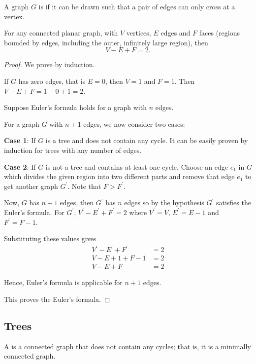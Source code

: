 \begin{definition}
A graph $G$ is  if it can be drawn such that a pair of edges can only cross at a vertex.
\end{definition}

\begin{theorem}
For any connected planar graph, with $V$ vertices, $E$ edges and $F$ faces (regions bounded by edges, including the outer, infinitely large region), then
\begin{equation}
V-E+F=2.
\end{equation}
\end{theorem}

\begin{proof}
We prove by induction.

If $G$ has zero edges, that is $E=0$, then $V=1$ and $F=1$. Then $V-E+F=1-0+1=2$.

Suppose Euler's formula holds for a graph with $n$ edges.

For a graph $G$ with $n+1$ edges, we now consider two cases:

\textbf{Case 1}: If $G$ is a tree and does not contain any cycle. It can be easily proven by induction for trees with any number of edges.

\textbf{Case 2}: If $G$ is not a tree and contains at least one cycle. Choose an edge $e_1$ in $G$ which divides the given region into two different parts and remove that edge $e_1$ to get another graph $G^\prime$. Note that $F>F^\prime$.

Now, $G$ has $n+1$ edges, then $G^\prime$ has $n$ edges so by the hypothesis $G^\prime$ satisfies the Euler's formula. For $G^\prime$, $V^\prime-E^\prime+F^\prime=2$ where $V^\prime=V$, $E^\prime=E-1$ and $F^\prime=F-1$.

Substituting these values gives
\begin{align*}
V^\prime-E^\prime+F^\prime&=2\\
V-E+1+F-1&=2\\
V-E+F&=2
\end{align*}

Hence, Euler's formula is applicable for $n+1$ edges.

This proves the Euler's formula.
\end{proof}

\subsection{Trees}
\begin{definition}[Tree]
A  is a connected graph that does not contain any cycles; that is, it is a minimally connected graph.
\end{definition}

